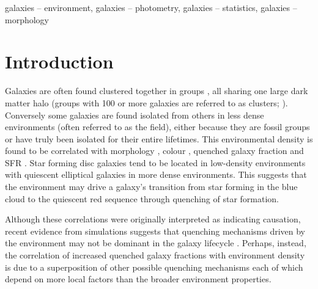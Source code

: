 \documentclass[useAMS,usenatbib]{mn2e}
\begin{document}
\begin{keywords}
galaxies -- environment, galaxies -- photometry, galaxies -- statistics, galaxies -- morphology
\end{keywords}


\section{Introduction}\label{sec:intro}

Galaxies are often found clustered together in groups \citep{zwicky38, zwicky52, abell58}, all sharing one large dark matter halo (groups with 100 or more galaxies are referred to as clusters; \citealt{bower04}). Conversely some galaxies are found isolated from others in less dense environments (often referred to as the field), either because they are fossil groups \citep[where all members have eventually merged;][]{ponman94, jones00, jones03} or have truly been isolated for their entire lifetimes. This environmental density is found to be correlated with morphology \citep{dressler80, smail97, poggianti99, postman05, Bamford09}, colour \citep{butcher78, pimbblet02}, quenched galaxy fraction \citep{kauffmann03, Baldry06, peng12, darvish16} and SFR \citep{gomez03}. Star forming disc galaxies tend to be located in low-density environments with quiescent elliptical galaxies in more dense environments. This suggests that the environment may drive a galaxy's transition from star forming in the blue cloud to the quiescent red sequence through quenching of star formation. 
 
Although these correlations were originally interpreted as indicating causation, recent evidence from simulations suggests that quenching mechanisms driven by the environment may not be dominant in the galaxy lifecycle \citep{kimm09, kimm11, hirschmann14, wang14, phillips15, emerick16, fillingham16}. Perhaps, instead, the correlation of increased quenched galaxy fractions with environment density is due to a superposition of other possible quenching mechanisms each of which depend on more local factors than the broader environment properties. 
  
\end{document}
